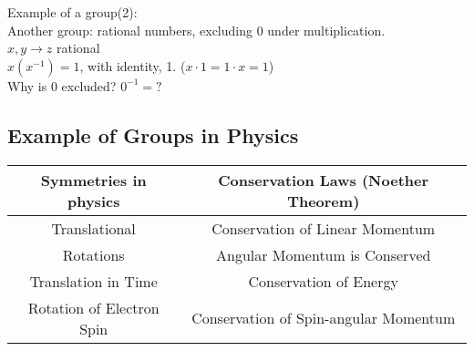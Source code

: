 \documentclass[a4paper, 12pt]{article}
\begin{document}
Example of a group(2):\\
\tab Another group: rational numbers, excluding 0 under multiplication.\\
\tab \tab $x,y \longrightarrow z$ rational \\
\tab \tab $x(x^{-1})=1$, with identity, 1. ($x \cdot 1= 1 \cdot x =1$)\\
\tab \tab  Why is 0 excluded?  $0^{-1} = ?$


\subsection{Example of Groups in Physics}
\begin{tabular}{|c|c|} 
\hline 
Symmetries in physics & Conservation Laws (Noether Theorem) \\
\hline  
Translational & Conservation of Linear Momentum\\
\hline  
Rotations & Angular Momentum is Conserved\\
\hline  
Translation in Time & Conservation of Energy\\
\hline
Rotation of Electron Spin &   Conservation of Spin-angular Momentum\\
\hline
\end{tabular}
\end{document}
